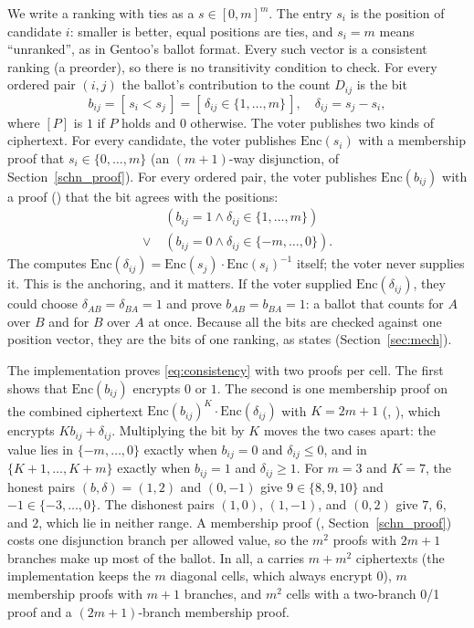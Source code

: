 We write a ranking with ties as a  $s \in [0,m]^m$. The entry $s_i$ is
the position of candidate $i$: smaller is better, equal positions are ties,
and $s_i = m$ means ``unranked'', as in Gentoo's ballot format. Every such
vector is a consistent ranking (a preorder), so there is no transitivity
condition to check. For every
ordered pair $(i,j)$ the ballot's contribution to the count $D_{ij}$ is
the bit
\[
  b_{ij} = [\,s_i < s_j\,] = [\,\delta_{ij} \in \{1,\ldots,m\}\,],
  \quad \delta_{ij} = s_j - s_i,
\]
where $[P]$ is $1$ if $P$ holds and $0$ otherwise. The voter publishes
two kinds of ciphertext. For every candidate, the voter publishes
$\mathrm{Enc}(s_i)$ with a membership proof that $s_i \in
\{0,\ldots,m\}$ (an $(m{+}1)$-way disjunction,
 of Section~\ref{schn_proof}).
For every ordered pair, the voter publishes $\mathrm{Enc}(b_{ij})$ with a
proof () that the bit agrees with the positions:
\begin{equation}\label{eq:consistency}
  \begin{aligned}
    &(b_{ij} = 1 \wedge \delta_{ij} \in \{1,\ldots,m\})\\
    \vee\; &(b_{ij} = 0 \wedge \delta_{ij} \in \{-m,\ldots,0\}).
  \end{aligned}
\end{equation}
The  computes
$\mathrm{Enc}(\delta_{ij}) = \mathrm{Enc}(s_j)\cdot\mathrm{Enc}(s_i)^{-1}$
itself; the voter never supplies it. This is the anchoring, and it
matters. If the voter supplied $\mathrm{Enc}(\delta_{ij})$, they could
choose $\delta_{AB} = \delta_{BA} = 1$ and prove $b_{AB} = b_{BA} = 1$:
a ballot that counts for $A$ over $B$ and for $B$ over $A$ at once.
Because all the bits are checked against one position vector, they are
the bits of one ranking, as  states
(Section~\ref{sec:mech}).

The implementation proves \eqref{eq:consistency} with two proofs per
cell. The first shows that $\mathrm{Enc}(b_{ij})$ encrypts $0$ or $1$.
The second is one membership proof on the combined ciphertext
$\mathrm{Enc}(b_{ij})^{K}\cdot\mathrm{Enc}(\delta_{ij})$ with $K = 2m+1$
(, ), which encrypts $K b_{ij} +
\delta_{ij}$. Multiplying the bit by $K$ moves the two cases apart: the
value lies in $\{-m,\ldots,0\}$ exactly when $b_{ij}=0$ and
$\delta_{ij}\le 0$, and in $\{K+1,\ldots,K+m\}$ exactly when $b_{ij}=1$
and $\delta_{ij}\ge 1$. For $m = 3$ and $K = 7$, the honest pairs $(b,
\delta) = (1, 2)$ and $(0, -1)$ give $9 \in \{8, 9, 10\}$ and $-1 \in
\{-3, \ldots, 0\}$. The dishonest pairs $(1, 0)$, $(1, -1)$, and $(0,
2)$ give $7$, $6$, and $2$, which lie in neither range. A membership
proof (,
Section~\ref{schn_proof}) costs one disjunction branch per allowed
value, so the $m^2$ proofs with $2m+1$ branches make up most of the
ballot. In all, a  carries
$m + m^2$ ciphertexts (the implementation keeps the $m$ diagonal cells,
which always encrypt $0$), $m$ membership proofs with $m{+}1$ branches, and
$m^2$ cells with a two-branch 0/1 proof and a $(2m{+}1)$-branch membership
proof.

